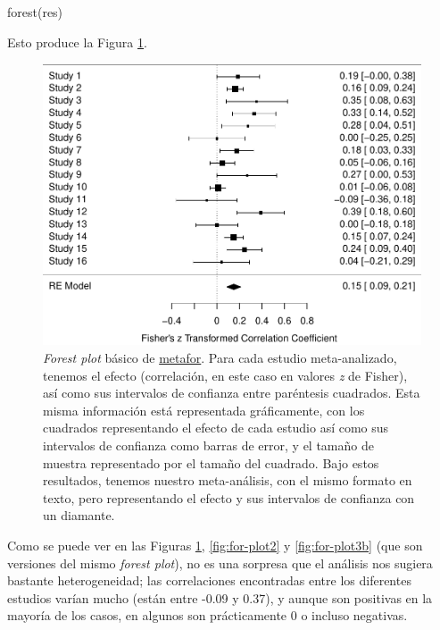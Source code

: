 \documentclass[
  bookmarksnumbered]{article}
\newenvironment{Shaded}{\begin{snugshade}}{\end{snugshade}}
\newcommand{\FunctionTok}[1]{\textcolor[rgb]{0.39,0.29,0.61}{#1}}
\newcommand{\NormalTok}[1]{\textcolor[rgb]{0.12,0.11,0.11}{#1}}
\begin{document}
\begin{Shaded}
\begin{Highlighting}[]
\FunctionTok{forest}\NormalTok{(res)}
\end{Highlighting}
\end{Shaded}

Esto produce la Figura \ref{fig:for-plot1}.

\begin{figure}
\centering
\includegraphics{Meta-analysis_files/figure-latex/for-plot1-1.pdf}
\caption{\label{fig:for-plot1}\emph{Forest plot} básico de \href{https://www.metafor-project.org/doku.php}{metafor}. Para cada estudio meta-analizado, tenemos el efecto (correlación, en este caso en valores \emph{z} de Fisher), así como sus intervalos de confianza entre paréntesis cuadrados. Esta misma información está representada gráficamente, con los cuadrados representando el efecto de cada estudio así como sus intervalos de confianza como barras de error, y el tamaño de muestra representado por el tamaño del cuadrado. Bajo estos resultados, tenemos nuestro meta-análisis, con el mismo formato en texto, pero representando el efecto y sus intervalos de confianza con un diamante.}
\end{figure}

Como se puede ver en las Figuras \ref{fig:for-plot1}, \ref{fig:for-plot2} y \ref{fig:for-plot3b} (que son versiones del mismo \emph{forest plot}), no es una sorpresa que el análisis nos sugiera bastante heterogeneidad; las correlaciones encontradas entre los diferentes estudios varían mucho (están entre -0.09 y 0.37), y aunque son positivas en la mayoría de los casos, en algunos son prácticamente 0 o incluso negativas.
\end{document}
